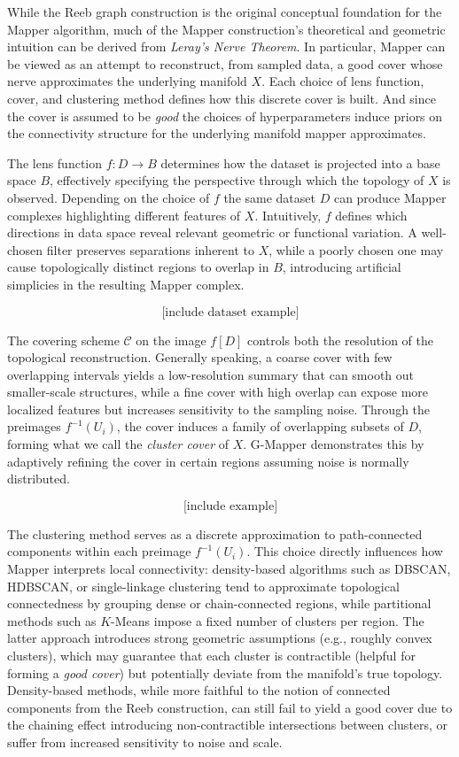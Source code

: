 While the Reeb graph construction is the original conceptual foundation for the Mapper 
algorithm, much of the Mapper construction's theoretical and geometric intuition 
can be derived from \emph{Leray’s Nerve Theorem}. In particular, Mapper can be viewed 
as an attempt to reconstruct, from sampled data, a good cover whose nerve 
approximates the underlying manifold $X$. Each choice of lens function, cover, 
and clustering method defines how this discrete cover is built. And since 
the cover is assumed to be \emph{good} the choices of hyperparameters induce priors on the 
connectivity structure for the underlying manifold mapper approximates.

The lens function $f : D \rightarrow B$ determines how the dataset is projected 
into a base space $B$, effectively specifying the perspective through which 
the topology of $X$ is observed. Depending on the choice of $f$
the same dataset $D$ can produce Mapper complexes highlighting different features 
of $X$. Intuitively, $f$ defines which directions in data space reveal relevant 
geometric or functional variation. A well-chosen filter preserves separations 
inherent to $X$, while a poorly chosen one may cause topologically distinct 
regions to overlap in $B$, introducing artificial simplicies in the resulting Mapper 
complex.

$$\text{[include dataset example]}$$

The covering scheme $\mathcal{C}$ on the image $f[D]$ controls both 
the resolution of the topological reconstruction. Generally speaking, a coarse cover 
with few overlapping intervals yields a low-resolution summary that can smooth 
out smaller-scale structures, while a fine cover with high overlap can expose more 
localized features but increases sensitivity to the sampling noise. 
Through the preimages $f^{-1}(U_i)$, the cover induces a family of overlapping 
subsets of $D$, forming what we call the \emph{cluster cover} of $X$. G-Mapper 
demonstrates this by adaptively refining the cover in certain regions assuming 
noise is normally distributed.

$$\text{[include example]}$$

The clustering method serves as a discrete approximation to 
path-connected components within each preimage $f^{-1}(U_i)$. This choice 
directly influences how Mapper interprets local connectivity: 
density-based algorithms such as DBSCAN, HDBSCAN, or single-linkage clustering 
tend to approximate topological connectedness by grouping dense or chain-connected 
regions, while partitional methods such as $K$-Means impose a fixed number of 
clusters per region. The latter approach introduces strong geometric assumptions 
(e.g., roughly convex clusters), which may guarantee that each cluster is 
contractible (helpful for forming a \emph{good cover}) but potentially deviate from 
the manifold’s true topology. Density-based methods, while more faithful to the 
notion of connected components from the Reeb construction, can still fail to yield a good cover due to 
the chaining effect introducing non-contractible intersections between clusters,
or suffer from increased sensitivity to noise and scale. 

